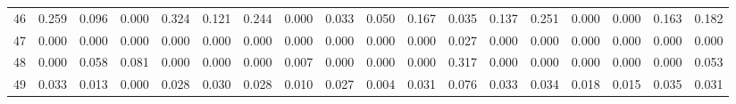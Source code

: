 \begin{table}
\begin{tabular}{llllllllllllllllll}
46 & 0.259 & 0.096 & 0.000 & 0.324 & 0.121 & 0.244 & 0.000 & 0.033 & 0.050 & 0.167 & 0.035 & 0.137 & 0.251 & 0.000 & 0.000 & 0.163 & 0.182 \\
47 & 0.000 & 0.000 & 0.000 & 0.000 & 0.000 & 0.000 & 0.000 & 0.000 & 0.000 & 0.000 & 0.027 & 0.000 & 0.000 & 0.000 & 0.000 & 0.000 & 0.000 \\
48 & 0.000 & 0.058 & 0.081 & 0.000 & 0.000 & 0.000 & 0.007 & 0.000 & 0.000 & 0.000 & 0.317 & 0.000 & 0.000 & 0.000 & 0.000 & 0.000 & 0.053 \\
49 & 0.033 & 0.013 & 0.000 & 0.028 & 0.030 & 0.028 & 0.010 & 0.027 & 0.004 & 0.031 & 0.076 & 0.033 & 0.034 & 0.018 & 0.015 & 0.035 & 0.031 \\
\bottomrule
\end{tabular}
\end{table}
